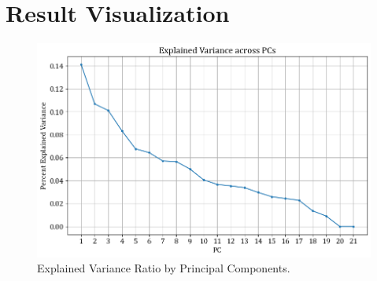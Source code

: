\documentclass[11pt,a4paper]{article}
\begin{document}
\section{Result Visualization}
\begin{figure}[H]
	\centering
	\includegraphics[scale=0.5]{images/pc_variance.png}
	\caption{Explained Variance Ratio by Principal Components.} %
	\label{fig:pca_variance}
\end{figure}
\end{document}
